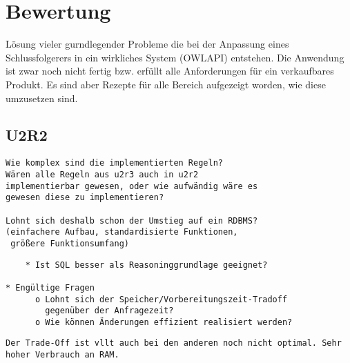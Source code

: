 \chapter{Bewertung}

Lösung vieler gurndlegender Probleme die bei der Anpassung eines Schlussfolgerers in ein wirkliches System (OWLAPI) entstehen. Die Anwendung ist zwar noch nicht fertig bzw. erfüllt alle Anforderungen für ein verkaufbares Produkt. Es sind aber Rezepte für alle Bereich aufgezeigt worden, wie diese umzusetzen sind.

\section{U2R2}
\begin{verbatim} 
Wie komplex sind die implementierten Regeln?
Wären alle Regeln aus u2r3 auch in u2r2
implementierbar gewesen, oder wie aufwändig wäre es
gewesen diese zu implementieren?

Lohnt sich deshalb schon der Umstieg auf ein RDBMS?
(einfachere Aufbau, standardisierte Funktionen,
 größere Funktionsumfang) 
\end{verbatim}

\begin{verbatim}
    * Ist SQL besser als Reasoninggrundlage geeignet?

* Engültige Fragen
      o Lohnt sich der Speicher/Vorbereitungszeit-Tradoff
        gegenüber der Anfragezeit?
      o Wie können Änderungen effizient realisiert werden? 
\end{verbatim}

\begin{verbatim}
Der Trade-Off ist vllt auch bei den anderen noch nicht optimal. Sehr hoher Verbrauch an RAM.
\end{verbatim}